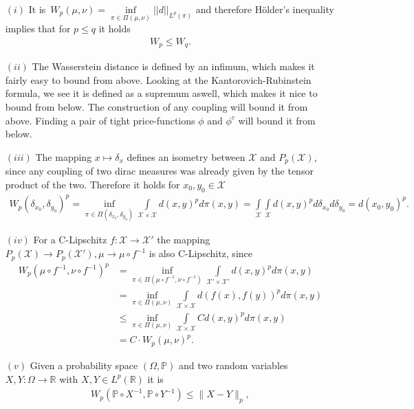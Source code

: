 \documentclass[11pt,a4paper]{article}
\begin{document}
\begin{itemize}
\item[$(i)$]It is \,$W_p(\mu,\nu) = \inf\limits_{\pi\in\Pi(\mu,\nu)}||d||_{L^p(\pi)}$ and therefore Hölder's inequality implies that for $p\leq{}q$ it holds
\begin{align*}
W_p\leq{}W_q.
\end{align*}
\item[$(ii)$]The Wasserstein distance is defined by an infimum, which makes it fairly easy to bound from above. Looking at the Kantorovich-Rubinstein formula, we see it is defined as a supremum aswell, which makes it nice to bound from below. The construction of any coupling will bound it from above. Finding a pair of tight price-functions $\phi$ and $\phi^c$ will bound it from below. 
\item[$(iii)$]The mapping $x\mapsto\delta_x$ defines an isometry between $\mathcal{X}$ and $P_p(\mathcal{X})$, since any coupling of two dirac measures was already given by the tensor product of the two. Therefore it holds for $x_0,y_0\in\mathcal{X}$
\begin{align*}
W_p(\delta_{x_0},\delta_{y_0})^p = \inf\limits_{\pi\in\Pi(\delta_{x_0},\delta_{y_0})}\int\limits_{\mathcal{X\times{}X}}d(x,y)^pd\pi(x,y) = \int\limits_{\mathcal{X}}\int\limits_{\mathcal{X}}d(x,y)^pd\delta_{x_0}d\delta_{y_0} = d(x_0,y_0)^p.
\end{align*}
\item[$(iv)$]For a C-Lipschitz $f:\mathcal{X}\rightarrow\mathcal{X'}$ the mapping $P_p(\mathcal{X})\rightarrow{}P_p(\mathcal{X'}),\mu\rightarrow{}\mu\circ{}f^{-1}$ is also C-Lipschitz, since
\begin{align*}
W_p(\mu\circ{}f^{-1},\nu\circ{}f^{-1})^p &= \inf\limits_{\pi\in\Pi(\mu\circ{}f^{-1},\nu\circ{}f^{-1})}\int\limits_{\mathcal{X'\times{}X'}}d(x,y)^pd\pi(x,y) \\&= \inf\limits_{\pi\in\Pi(\mu,\nu)}\int\limits_{\mathcal{X\times{}X}}d(f(x),f(y))^pd\pi(x,y)\\&\leq{}\inf\limits_{\pi\in\Pi(\mu,\nu)}\int\limits_{\mathcal{X\times{}X}}Cd(x,y)^pd\pi(x,y) \\&= C\cdot{}W_p(\mu,\nu)^p.
\end{align*}
\item[$(v)$] Given a probability space $(\Omega,\mathbb{P})$ and two random variables $X,Y:\Omega\rightarrow\mathbb{R}$ with $X,Y\in{}L^p(\mathbb{R})$ it is \begin{align*}
W_p(\mathbb{P}\circ{}X^{-1},\mathbb{P}\circ{}Y^{-1})\leq\|X-Y\|_{p},
\end{align*} 

\end{itemize}
\end{document}

